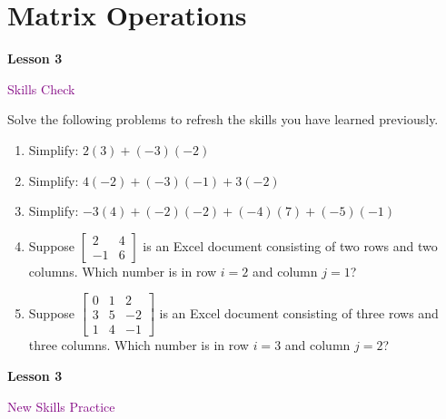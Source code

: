 \documentclass[10pt]{book}
\theoremstyle{definition}
\theoremstyle{remark}
\begin{document}
\section{Matrix Operations}
\begin{tcolorbox}[
  width=\textwidth,
  colback=gray!10, %
  colframe=white, %
  boxrule=0pt,    %
  left=1cm,       %
  right=1cm,      %
  sharp corners  %
]

\begin{minipage}[t]{0.5\textwidth}
  \Huge \textbf{Lesson 3}
\end{minipage}%
\hfill
\begin{minipage}[t]{0.5\textwidth}
  \Huge \textcolor{purple}{Skills Check}
\end{minipage}
\end{tcolorbox}

\begin{large}
\noindent
Solve the following problems to refresh the skills you have learned previously.
\begin{enumerate}
\item Simplify: $2(3) + (-3)(-2)$\vfil \vfil \vfil
\item Simplify: $4(-2) + (-3)(-1) + 3(-2)$\vfil \vfil \vfil
\item Simplify: $-3(4) + (-2)(-2) + (-4)(7) + (-5)(-1)$\vfil \vfil\vfil
\item Suppose $\begin{bmatrix}  2 & 4 \\ -1 & 6 \end{bmatrix}$ is an Excel document consisting of two rows and two columns. Which number is in row $i=2$ and column $j=1$?\vfil \vfil \vfil
\item Suppose $\begin{bmatrix}  0&1&2\\3&5&-2\\1&4&-1 \end{bmatrix}$ is an Excel document consisting of three rows and three columns. Which number is in row $i=3$ and column $j=2$?\vfil \vfil \vfil
\end{enumerate}
\end{large}
\newpage


\begin{tcolorbox}[
  width=\textwidth,
  colback=gray!10, %
  colframe=white, %
  boxrule=0pt,    %
  left=1cm,       %
  right=1cm,      %
  sharp corners  %
]

\begin{minipage}[t]{0.5\textwidth}
  \Huge \textbf{Lesson 3}
\end{minipage}%
\hfill
\begin{minipage}[t]{0.5\textwidth}
  \Huge\textcolor{purple}{New Skills Practice}
\end{minipage}
\end{tcolorbox}
\end{document}
